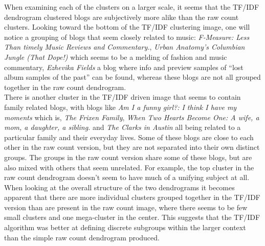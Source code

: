 When examining each of the clusters on a larger scale, it seems that the TF/IDF dendrogram clustered blogs are subjectively more alike than the raw count clusters. Looking toward the bottom of the TF/IDF clustering image, one will notice a grouping of blogs that seem closely related to music: {\it F-Measure: Less Than timely Music Reviews and Commentary.}, {\it Urban Anatomy's Columbian Jungle (That Dope!)} which seems to be a melding of fashion and music commentary, {\it Ezhevika Fields} a blog where info and preview samples of ``lost album samples of the past'' can be found, whereas these blogs are not all grouped together in the raw count dendrogram.\\

There is another cluster in the TF/IDF driven image that seems to contain family related blogs, with blogs like {\it Am I a funny girl?: I think I have my moments} which is, {\it The Frixen Family}, {\it When Two Hearts Become One: A wife, a mom, a daughter, a sibling.} and {\it The Clarks in Austin} all being related to a particular family and their everyday lives. Some of these blogs are close to each other in the raw count version, but they are not separated into their own distinct groups. The groups in the raw count version share some of these blogs, but are also mixed with others that seem unrelated. For example, the top cluster in the raw count dendrogram doesn't seem to have much of a unifying subject at all.\\

When looking at the overall structure of the two dendrograms it becomes apparent that there are more individual clusters grouped together in the TF/IDF version than are present in the raw count image, where there seems to be few small clusters and one mega-cluster in the center. This suggests that the TF/IDF algorithm was better at defining discrete subgroups within the larger context than the simple raw count dendrogram produced.

